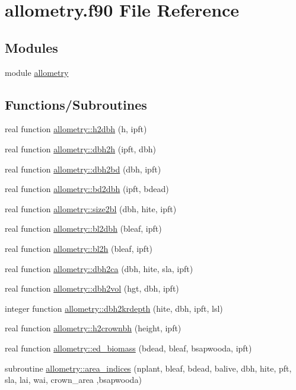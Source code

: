 \hypertarget{allometry_8f90}{}\section{allometry.\+f90 File Reference}
\label{allometry_8f90}
\subsection*{Modules}
\begin{DoxyCompactItemize}
\item 
module \hyperlink{namespaceallometry}{allometry}
\end{DoxyCompactItemize}
\subsection*{Functions/\+Subroutines}
\begin{DoxyCompactItemize}
\item 
real function \hyperlink{namespaceallometry_a31aa8db06e86ec74efb5e692417399df}{allometry\+::h2dbh} (h, ipft)
\item 
real function \hyperlink{namespaceallometry_a56f11dc07da4d5e7114dc37d6cc5f2cc}{allometry\+::dbh2h} (ipft, dbh)
\item 
real function \hyperlink{namespaceallometry_a76db2bc4aaa47db1e2656117ec476dba}{allometry\+::dbh2bd} (dbh, ipft)
\item 
real function \hyperlink{namespaceallometry_a50fedbee3a14eb5569a62abb4a36198f}{allometry\+::bd2dbh} (ipft, bdead)
\item 
real function \hyperlink{namespaceallometry_a45ced9bf9ccd03debe8def35b579f4bd}{allometry\+::size2bl} (dbh, hite, ipft)
\item 
real function \hyperlink{namespaceallometry_a3236375dc165a26aeea2d97c7e2c2685}{allometry\+::bl2dbh} (bleaf, ipft)
\item 
real function \hyperlink{namespaceallometry_a59a1fc10140498dee62fce8a641da254}{allometry\+::bl2h} (bleaf, ipft)
\item 
real function \hyperlink{namespaceallometry_abacdf8e8e585ce8d788a1fc2be133243}{allometry\+::dbh2ca} (dbh, hite, sla, ipft)
\item 
real function \hyperlink{namespaceallometry_aab2b2cee61cac31529246b043121c7de}{allometry\+::dbh2vol} (hgt, dbh, ipft)
\item 
integer function \hyperlink{namespaceallometry_ac1523ea0e0ef8d2dd6a429f61a013c1c}{allometry\+::dbh2krdepth} (hite, dbh, ipft, lsl)
\item 
real function \hyperlink{namespaceallometry_a88949ed487fccc2f1dfd065399043b0d}{allometry\+::h2crownbh} (height, ipft)
\item 
real function \hyperlink{namespaceallometry_ab99b16f69dafaf5ff3e69c7514b9e7b6}{allometry\+::ed\+\_\+biomass} (bdead, bleaf, bsapwooda, ipft)
\item 
subroutine \hyperlink{namespaceallometry_af723dc0f45a94b8812583457c53d4308}{allometry\+::area\+\_\+indices} (nplant, bleaf, bdead, balive, dbh, hite, pft, sla, lai, wai, crown\+\_\+area                                                                                                           ,bsapwooda)
\end{DoxyCompactItemize}
